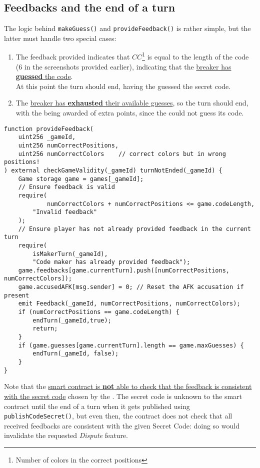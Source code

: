 \subsection{Feedbacks and the end of a turn}
{The logic behind \texttt{makeGuess()} and \texttt{provideFeedback()} is rather simple, but the latter must handle two special cases:\ns
\begin{enumerate}
    \item The feedback provided indicates that $CC$\footnote{Number of colors in the correct positions} is equal to the length of the code (6 in the screenshots provided earlier), indicating that the \ul{breaker has \textbf{guessed} the code}.\\
    At this point the turn should end, having the  guessed the secret code.
    \item The \ul{breaker has \textbf{exhausted} their available guesses}, so the turn should end, with the  being awarded of extra points, since the  could not guess its code.
\end{enumerate}}

\begin{lstlisting}
function provideFeedback(
    uint256 _gameId,
    uint256 numCorrectPositions,
    uint256 numCorrectColors    // correct colors but in wrong positions!
) external checkGameValidity(_gameId) turnNotEnded(_gameId) {
    Game storage game = games[_gameId];
    // Ensure feedback is valid
    require(
            numCorrectColors + numCorrectPositions <= game.codeLength,
        "Invalid feedback"
    );
    // Ensure player has not already provided feedback in the current turn
    require(
        isMakerTurn(_gameId),
        "Code maker has already provided feedback");
    game.feedbacks[game.currentTurn].push([numCorrectPositions, numCorrectColors]);
    game.accusedAFK[msg.sender] = 0; // Reset the AFK accusation if present
    emit Feedback(_gameId, numCorrectPositions, numCorrectColors);
    if (numCorrectPositions == game.codeLength) {
        endTurn(_gameId,true);
        return;
    }
    if (game.guesses[game.currentTurn].length == game.maxGuesses) {
        endTurn(_gameId, false);
    }
}
\end{lstlisting}

Note that the \ul{smart contract is \textbf{not} able to check that the feedback is consistent with the secret code} chosen by the . The secret code is unknown to the smart contract until the end of a turn when it gets published using \texttt{publishCodeSecret()}, but even then, the contract does not check that all received feedbacks are consistent with the given Secret Code: doing so would invalidate the requested \textit{Dispute} feature.

